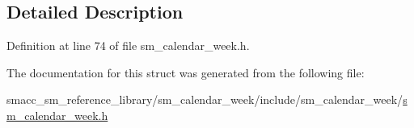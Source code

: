 \subsection{Detailed Description}


Definition at line 74 of file sm\+\_\+calendar\+\_\+week.\+h.



The documentation for this struct was generated from the following file\+:\begin{DoxyCompactItemize}
\item 
smacc\+\_\+sm\+\_\+reference\+\_\+library/sm\+\_\+calendar\+\_\+week/include/sm\+\_\+calendar\+\_\+week/\hyperlink{sm__calendar__week_8h}{sm\+\_\+calendar\+\_\+week.\+h}\end{DoxyCompactItemize}
